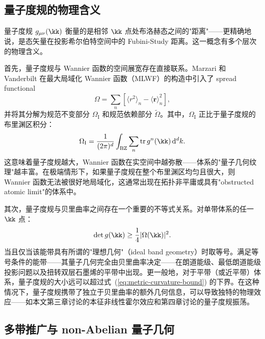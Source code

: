 \subsection{量子度规的物理含义}
\label{subsec:metric-physical}

量子度规 $g_{\mu\nu}(\kk)$ 衡量的是相邻 $\kk$ 点处布洛赫态之间的"距离"——更精确地说，是态矢量在投影希尔伯特空间中的 Fubini-Study 距离。这一概念有多个层次的物理含义。

首先，量子度规与 Wannier 函数的空间展宽存在直接联系。Marzari 和 Vanderbilt 在最大局域化 Wannier 函数（MLWF）的构造中\cite{wannier1}引入了 spread functional
\begin{equation}
  \Omega = \sum_n \left[ \langle r^2 \rangle_n - \langle \bm{r} \rangle_n^2 \right],
\end{equation}
并将其分解为规范不变部分 $\Omega_\mathrm{I}$ 和规范依赖部分 $\tilde{\Omega}$。其中，$\Omega_\mathrm{I}$ 正比于量子度规的布里渊区积分\cite{Resta_2010}：
\begin{equation}
  \Omega_\mathrm{I} = \frac{1}{(2\pi)^d} \int_{\mathrm{BZ}} \sum_n \mathrm{tr}\, g^n(\kk) \, \mathrm{d}^d k.
\end{equation}
这意味着量子度规越大，Wannier 函数在实空间中越弥散——体系的"量子几何纹理"越丰富。在极端情形下，如果量子度规在整个布里渊区均匀且很大，则 Wannier 函数无法被很好地局域化，这通常出现在拓扑非平庸或具有"obstructed atomic limit"的体系中。

其次，量子度规与贝里曲率之间存在一个重要的不等式关系。对单带体系的任一 $\kk$ 点：
\begin{equation}
  \det g(\kk) \geq \frac{1}{4} |\Omega(\kk)|^2.
\label{eq:metric-curvature-bound}
\end{equation}
当且仅当该能带具有所谓的"理想几何"（ideal band geometry）时取等号。满足等号条件的能带——其量子几何完全由贝里曲率决定——在朗道能级、最低朗道能级投影问题以及扭转双层石墨烯的平带中出现\cite{PhysRevResearch.1.032019}。更一般地，对于平带（或近平带）体系，量子度规的大小远可以超过式~(\ref{eq:metric-curvature-bound}) 的下界。在这种情况下，量子度规携带了独立于贝里曲率的额外几何信息，可以导致独特的物理效应——如本文第三章讨论的本征非线性霍尔效应和第四章讨论的量子度规振荡。

\subsection{多带推广与 non-Abelian 量子几何}

